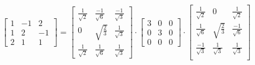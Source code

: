 \documentclass[a4paper, spanish]{article}
\begin{document}
  \begin{align}
    \begin{bmatrix}
      1 & -1 & 2\\
      1 & 2 & -1\\
      2 & 1 & 1
    \end{bmatrix}
    =
    \begin{bmatrix}
      \frac{1}{\sqrt{2}} & \frac{-1}{\sqrt{6}} & \frac{-1}{\sqrt{3}} \\
      0 & \sqrt{\frac{2}{3}} & \frac{1}{\sqrt{3}} \\
      \frac{1}{\sqrt{2}} & \frac{1}{\sqrt{6}} & \frac{1}{\sqrt{3}}
    \end{bmatrix}
    \cdot
    \begin{bmatrix}
      3 & 0 & 0\\
      0 & 3 & 0\\
      0 & 0 & 0
    \end{bmatrix}
    \cdot
    \begin{bmatrix}
      \frac{1}{\sqrt{2}} & 0 & \frac{1}{\sqrt{2}} \\
      \frac{1}{\sqrt{6}} & \sqrt{\frac{2}{3}} & \frac{-1}{\sqrt{6}} \\
      \frac{-1}{\sqrt{3}} & \frac{1}{\sqrt{3}} & \frac{1}{\sqrt{3}} \\
    \end{bmatrix}
  \end{align}
\end{document}
